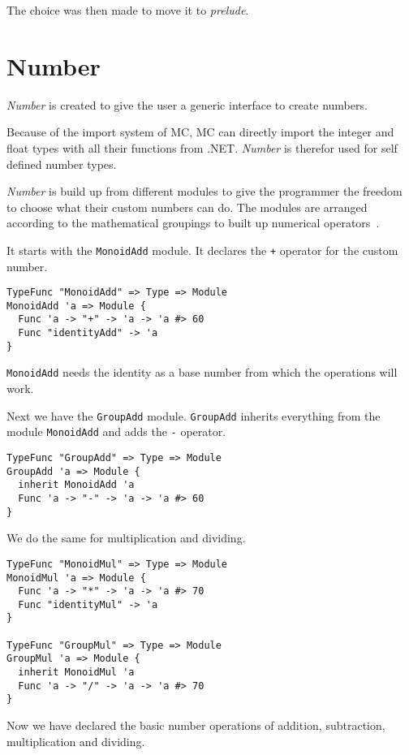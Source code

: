 The choice was then made to move it to \emph{prelude}.


\section{Number}
\emph{Number} is created to give the user a generic interface to create numbers.

Because of the import system of MC, MC can directly import the integer and float types with all their functions from .NET.
\emph{Number} is therefor used for self defined number types.

\emph{Number} is build up from different modules to give the programmer the freedom to choose what their custom numbers can do.
The modules are arranged according to the mathematical groupings to built up numerical operators~\cite{bourbaki1998commutative}.

It starts with the \texttt{MonoidAdd} module.
It declares the \texttt{+} operator for the custom number.

\begin{lstlisting}
TypeFunc "MonoidAdd" => Type => Module
MonoidAdd 'a => Module {
  Func 'a -> "+" -> 'a -> 'a #> 60
  Func "identityAdd" -> 'a
}
\end{lstlisting}

\texttt{MonoidAdd} needs the identity as a base number from which the operations will work.

Next we have the \texttt{GroupAdd} module.
\texttt{GroupAdd} inherits everything from the module \texttt{MonoidAdd} and adds the \texttt{-} operator.

\begin{lstlisting}
TypeFunc "GroupAdd" => Type => Module
GroupAdd 'a => Module {
  inherit MonoidAdd 'a
  Func 'a -> "-" -> 'a -> 'a #> 60
}
\end{lstlisting}

We do the same for multiplication and dividing.

\begin{lstlisting}
TypeFunc "MonoidMul" => Type => Module
MonoidMul 'a => Module {
  Func 'a -> "*" -> 'a -> 'a #> 70
  Func "identityMul" -> 'a
}

TypeFunc "GroupMul" => Type => Module
GroupMul 'a => Module {
  inherit MonoidMul 'a
  Func 'a -> "/" -> 'a -> 'a #> 70
}
\end{lstlisting}

Now we have declared the basic number operations of addition, subtraction, multiplication and dividing.

